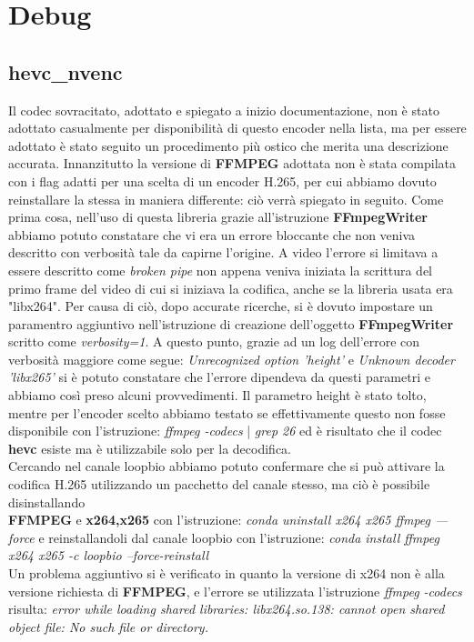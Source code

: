 \chapter{Debug}
\label{chap:debug}
\section{hevc\_nvenc}
\label{sec:nvenc}
Il codec sovracitato, adottato e spiegato a inizio documentazione, non è stato adottato casualmente per disponibilità di questo encoder nella lista, ma per essere adottato è stato seguito un procedimento più ostico che merita una descrizione accurata. 
Innanzitutto la versione di \textbf{FFMPEG} adottata non è stata compilata con i flag adatti per una scelta di un encoder H.265, per cui abbiamo dovuto reinstallare la stessa in maniera differente: ciò verrà spiegato in seguito. Come prima cosa, nell'uso di questa libreria grazie all'istruzione \textbf{FFmpegWriter} abbiamo potuto constatare che vi era un errore bloccante che non veniva descritto con verbosità tale da capirne l'origine. A video l'errore si limitava a essere descritto come \emph{broken pipe} non appena veniva iniziata la scrittura del primo frame del video di cui si iniziava la codifica, anche se la libreria usata era "libx264". Per causa di ciò, dopo accurate ricerche, si è dovuto impostare un paramentro aggiuntivo nell'istruzione di creazione dell'oggetto \textbf{FFmpegWriter} scritto come \emph{verbosity=1}. A questo punto, grazie ad un log dell'errore con verbosità maggiore come segue: \emph{Unrecognized option 'height’} e \emph{Unknown decoder 'libx265'} si è potuto constatare che l'errore dipendeva da questi parametri e abbiamo così preso alcuni provvedimenti. Il parametro height è stato tolto, mentre per l'encoder scelto abbiamo testato se effettivamente questo non fosse disponibile con l'istruzione: \emph{ffmpeg -codecs } | \emph{grep 26} ed è risultato che il codec \textbf{hevc} esiste ma è utilizzabile solo per la decodifica.\\
Cercando nel canale loopbio abbiamo potuto confermare che si può attivare la codifica H.265 utilizzando un pacchetto del canale stesso, ma ciò è possibile disinstallando\\ \textbf{FFMPEG} e \textbf{x264,x265} con l'istruzione:
\emph{conda uninstall x264 x265 ffmpeg —force} e reinstallandoli dal canale loopbio con l'istruzione: \emph{conda install ffmpeg x264 x265 -c loopbio --force-reinstall}\\
Un problema aggiuntivo si è verificato in quanto la versione di x264 non è alla versione richiesta di \textbf{FFMPEG}, e l'errore se utilizzata l'istruzione \emph{ffmpeg -codecs } risulta: \emph{error while loading shared libraries: libx264.so.138: cannot open shared object file: No such file or directory.}\\
